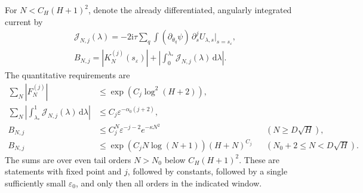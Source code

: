 \documentclass[11pt]{article}
\numberwithin{equation}{section}
\theoremstyle{definition}
\newcommand{\dd}{\,\mathrm d}
\newcommand{\ii}{\mathrm i}
\newcommand{\eps}{\varepsilon}
\begin{document}
For \(N<C_H(H+1)^2\), denote the already differentiated,
angularly integrated current by
\begin{gather*}
 \mathcal J_{N,j}(\lambda)
   =-2\ii\tau\sum_q\int(\partial_{\theta_q}\psi)\,
              \partial_s^j U_{\lambda,s}\big|_{s=s_\eps},\\
 B_{N,j}=|K_N^{(j)}(s_\eps)|
       +\left|\int_0^{\lambda_*}\mathcal J_{N,j}(\lambda)\dd\lambda\right|.
\end{gather*}
The quantitative requirements are
\begin{align}
 \sum_N|F_N^{(j)}|
   &\le \exp(C_j\log^2(H+2)),\label{eq:reqF}\\
 \sum_N\left|\int_{\lambda_*}^1
               \mathcal J_{N,j}(\lambda)\dd\lambda\right|
   &\le C_j\eps^{-\alpha_0(j+2)},\label{eq:reqLS}\\
 B_{N,j}
   &\le C_j^N\eps^{-j-2}e^{-\kappa N^2}
             &&(N\ge D\sqrt H),\label{eq:reqhigh}\\
 B_{N,j}
   &\le \exp(C_jN\log(N+1))(H+N)^{C_j}
             &&(N_0+2\le N<D\sqrt H).\label{eq:reqinter}
\end{align}
The sums are over even tail orders \(N>N_0\) below \(C_H(H+1)^2\).
These are statements with fixed point and \(j\), followed by constants,
followed by a single sufficiently small \(\eps_0\), and only then all
orders in the indicated window.



\end{document}
